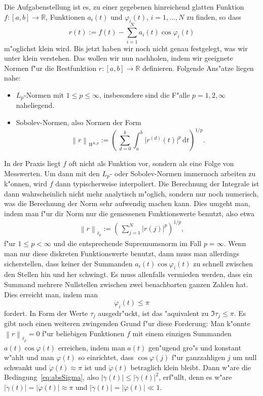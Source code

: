 \documentclass[a4paper]{scrartcl}
\newcommand{\R}{{\mathbb{R}}}
\newcommand{\de}{{\mathrm{d}}}
\newcommand{\norm}[1]{{\left\lVert#1\right\rVert}}
\newcommand{\pphi}{{\varphi}}
\begin{document}
Die Aufgabenstellung ist es, zu einer gegebenen hinreichend glatten Funktion $f:[a,b]\to\R$, Funktionen $a_i(t)$ und $\pphi_i(t)$, $i=1,\dotsc,N$ zu finden, so dass 
$$ r(t) := f(t)-\sum_{i=1}^N a_i(t)\cos\pphi_i(t) $$
m"oglichst klein wird. 
Bis jetzt haben wir noch nicht genau festgelegt, was wir unter \glqq{}klein\grqq{} verstehen. 
Das wollen wir nun nachholen, indem wir geeignete Normen f"ur die Restfunktion $r:[a,b]\to\R$ definieren. 
Folgende Ans"atze liegen nahe:
\begin{itemize}
\item $L_p$-Normen mit $1\le p\le\infty$, insbesondere sind die F"alle $p=1,2,\infty$ naheliegend. 
\item Sobolev-Normen, also Normen der Form
$$ \norm{r}_{W^{k,p}} := \left(\,\sum_{d=0}^k\int_a^b \lvert r^{(d)}(t)\rvert^p\,\de t\right)^{1/p}. $$
\end{itemize}
In der Praxis liegt $f$ oft nicht als Funktion vor, sondern als eine Folge von Messwerten. 
Um dann mit den $L_p$- oder Sobolev-Normen immernoch arbeiten zu k"onnen, wird $f$ dann typischerweise interpoliert. 
Die Berechnung der Integrale ist dann wahrscheinlich nicht mehr analytisch m"oglich, sondern nur noch numerisch, was die Berechnung der Norm sehr aufwendig machen kann. 
Dies umgeht man, indem man f"ur dir Norm nur die gemessenen Funktionswerte benutzt, also etwa
\begin{align} \label{eq:lpnormr}
\norm{r}_{\ell_p} := \left(\,\sum_{j=1}^{N}\lvert r(j)\rvert^p\right)^{1/p},
\end{align}
f"ur $1\le p<\infty$ und die entsprechende Supremumsnorm im Fall $p=\infty$. 
Wenn man nur diese diskreten Funktionswerte benutzt, dann muss man allerdings sicherstellen, dass keiner der Summanden $a_i(t)\cos\pphi_i(t)$ zu schnell zwischen den Stellen hin und her schwingt. 
Es muss allenfalls vermieden werden, dass ein Summand mehrere Nullstellen zwischen zwei benachbarten ganzen Zahlen hat. Dies erreicht man, indem man 
\begin{equation} \label{eq:dotPhiLePi}
\dot\pphi_i(t)\le\pi
\end{equation}
fordert. In Form der Werte $\tau_j$ ausgedr"uckt, ist das "aquivalent zu $\Im\tau_j\le\pi$. 
Es gibt noch einen weiteren zwingenden Grund f"ur diese Forderung: Man k"onnte $\norm{r}_{\ell_p}=0$ f"ur beliebigen Funktionen $f$ mit einem einzigen Summanden $a(t)\cos\pphi(t)$ erreichen, indem man $a(t)$ gen"ugend gro"s und konstant w"ahlt und man $\pphi(t)$ so einrichtet, dass $\cos\pphi(j)$ f"ur ganzzahligen $j$ um null schwankt und $\dot\pphi(t)\approx\pi$ ist und $\ddot\pphi(t)$ betraglich klein bleibt. 
Dann w"are die Bedingung~\eqref{eq:absSigma}, also $\lvert\ddot\gamma(t)\rvert\le\lvert\dot\gamma(t)\rvert^2$,  erf"ullt, denn es w"are $ \lvert\dot\gamma(t)\rvert = \lvert\dot\pphi(t)\rvert \approx \pi $ und $\lvert\ddot\gamma(t)\rvert=\lvert\ddot\pphi(t)\rvert \ll 1$. 
\end{document}
